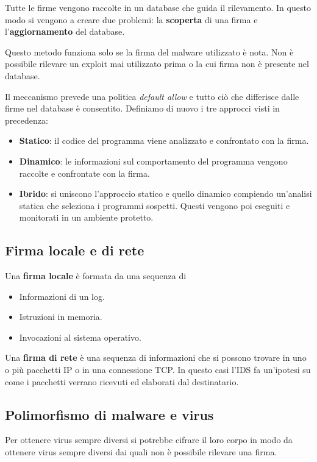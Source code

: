 Tutte le firme vengono raccolte in un database che guida il rilevamento. In questo modo si vengono a creare due
problemi: la \textbf{scoperta} di una firma e l'\textbf{aggiornamento} del database.

Questo metodo funziona solo se la firma del malware utilizzato è nota. Non è possibile rilevare un exploit mai
utilizzato prima o la cui firma non è presente nel database.

Il meccanismo prevede una politica \emph{default allow} e tutto ciò che differisce dalle firme nel database è
consentito. Definiamo di nuovo i tre approcci visti in precedenza:
\begin{itemize}
	\item \textbf{Statico}: il codice del programma viene analizzato e confrontato con la firma.
	\item \textbf{Dinamico}: le informazioni sul comportamento del programma vengono raccolte e confrontate con la
	      firma.
	\item \textbf{Ibrido}: si uniscono l'approccio statico e quello dinamico compiendo un'analisi statica che
	      seleziona i programmi sospetti. Questi vengono poi eseguiti e monitorati in un ambiente protetto.
\end{itemize}

\subsection{Firma locale e di rete}
Una \textbf{firma locale} è formata da una sequenza di
\begin{itemize}
	\item Informazioni di un log.
	\item Istruzioni in memoria.
	\item Invocazioni al sistema operativo.
\end{itemize}

Una \textbf{firma di rete} è una sequenza di informazioni che si possono trovare in uno o più pacchetti IP o in
una connessione TCP. In questo casi l'IDS fa un'ipotesi su come i pacchetti verrano ricevuti ed elaborati dal
destinatario.

\subsection{Polimorfismo di malware e virus}
Per ottenere virus sempre diversi si potrebbe cifrare il loro corpo in modo da ottenere virus sempre diversi dai quali
non è possibile rilevare una firma.

